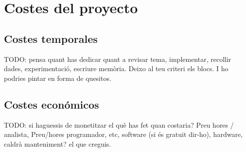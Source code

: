 \documentclass[../all.tex]{subfiles}
\begin{document}
\section{Costes del proyecto} 

\subsection{Costes temporales} 
	{\color{red} 
		TODO: pensa quant has dedicar quant a revisar tema, implementar, recollir dades, experimentació, escriure memòria. Deixo al teu criteri els blocs. I ho podries pintar en forma de quesitos.\\
	}

\subsection{Costes económicos} 
	{\color{red} 
		TODO: si haguessis de monetitzar el què has fet quan costaria? Preu hores / analista, Preu/hores programador, etc, software (si és gratuit dir-ho), hardware, caldrà manteniment? el que creguis.\\
	}
\end{document}
